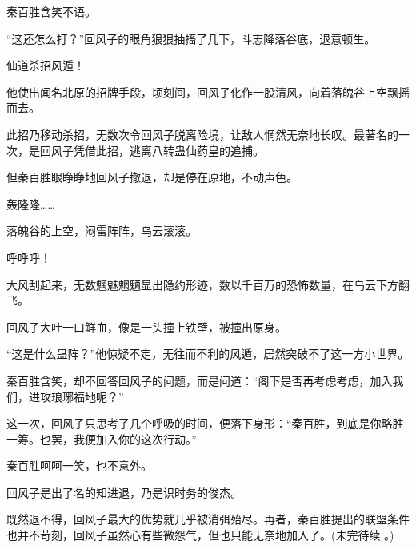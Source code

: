 \begin{this_body}
秦百胜含笑不语。

“这还怎么打？”回风子的眼角狠狠抽搐了几下，斗志降落谷底，退意顿生。

仙道杀招风遁！

他使出闻名北原的招牌手段，顷刻间，回风子化作一股清风，向着落魄谷上空飘摇而去。

此招乃移动杀招，无数次令回风子脱离险境，让敌人惘然无奈地长叹。最著名的一次，是回风子凭借此招，逃离八转蛊仙药皇的追捕。

但秦百胜眼睁睁地回风子撤退，却是停在原地，不动声色。

轰隆隆……

落魄谷的上空，闷雷阵阵，乌云滚滚。

呼呼呼！

大风刮起来，无数魑魅魍魉显出隐约形迹，数以千百万的恐怖数量，在乌云下方翻飞。

回风子大吐一口鲜血，像是一头撞上铁壁，被撞出原身。

“这是什么蛊阵？”他惊疑不定，无往而不利的风遁，居然突破不了这一方小世界。

秦百胜含笑，却不回答回风子的问题，而是问道：“阁下是否再考虑考虑，加入我们，进攻琅琊福地呢？”

这一次，回风子只思考了几个呼吸的时间，便落下身形：“秦百胜，到底是你略胜一筹。也罢，我便加入你的这次行动。”

秦百胜呵呵一笑，也不意外。

回风子是出了名的知进退，乃是识时务的俊杰。

既然退不得，回风子最大的优势就几乎被消弭殆尽。再者，秦百胜提出的联盟条件也并不苛刻，回风子虽然心有些微怨气，但也只能无奈地加入了。(未完待续 。)

\end{this_body}

